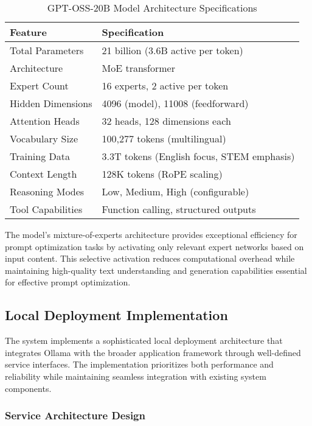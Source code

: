 \begin{table}[H]
\centering
\caption{GPT-OSS-20B Model Architecture Specifications}
\label{tab:gpt_oss_specs}
{\begin{tabular}{ll}
\toprule
\textbf{Feature} & \textbf{Specification} \\
\midrule
Total Parameters & 21 billion (3.6B active per token) \\
Architecture & MoE transformer \\
Expert Count & 16 experts, 2 active per token \\
Hidden Dimensions & 4096 (model), 11008 (feedforward) \\
Attention Heads & 32 heads, 128 dimensions each \\
Vocabulary Size & 100,277 tokens (multilingual) \\
Training Data & 3.3T tokens (English focus, STEM emphasis) \\
Context Length & 128K tokens (RoPE scaling) \\
Reasoning Modes & Low, Medium, High (configurable) \\
Tool Capabilities & Function calling, structured outputs \\
\bottomrule
\end{tabular}}
\end{table}

The model's mixture-of-experts architecture provides exceptional efficiency for prompt optimization tasks by activating only relevant expert networks based on input content. This selective activation reduces computational overhead while maintaining high-quality text understanding and generation capabilities essential for effective prompt optimization.

\subsection{Local Deployment Implementation}

The system implements a sophisticated local deployment architecture that integrates Ollama with the broader application framework through well-defined service interfaces. The implementation prioritizes both performance and reliability while maintaining seamless integration with existing system components.

\subsubsection{Service Architecture Design}

